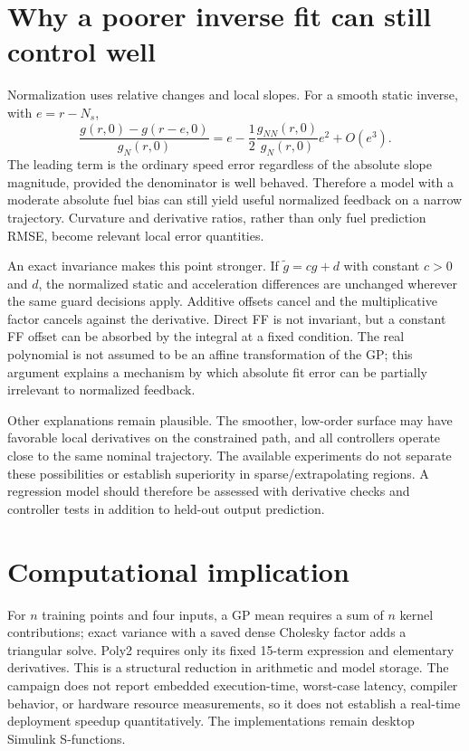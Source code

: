\section{Why a poorer inverse fit can still control well}
Normalization uses relative changes and local slopes. For a smooth static inverse, with $e=r-N_s$,
\begin{equation}
\frac{g(r,0)-g(r-e,0)}{g_N(r,0)}
=e-\frac12\frac{g_{NN}(r,0)}{g_N(r,0)}e^2+O(e^3).
\end{equation}
The leading term is the ordinary speed error regardless of the absolute slope magnitude, provided the denominator is well behaved. Therefore a model with a moderate absolute fuel bias can still yield useful normalized feedback on a narrow trajectory. Curvature and derivative ratios, rather than only fuel prediction RMSE, become relevant local error quantities.

An exact invariance makes this point stronger. If $\tilde g=cg+d$ with constant $c>0$ and $d$, the normalized static and acceleration differences are unchanged wherever the same guard decisions apply. Additive offsets cancel and the multiplicative factor cancels against the derivative. Direct FF is not invariant, but a constant FF offset can be absorbed by the integral at a fixed condition. The real polynomial is not assumed to be an affine transformation of the GP; this argument explains a mechanism by which absolute fit error can be partially irrelevant to normalized feedback.

Other explanations remain plausible. The smoother, low-order surface may have favorable local derivatives on the constrained path, and all controllers operate close to the same nominal trajectory. The available experiments do not separate these possibilities or establish superiority in sparse/extrapolating regions. A regression model should therefore be assessed with derivative checks and controller tests in addition to held-out output prediction.

\section{Computational implication}
For $n$ training points and four inputs, a GP mean requires a sum of $n$ kernel contributions; exact variance with a saved dense Cholesky factor adds a triangular solve. Poly2 requires only its fixed 15-term expression and elementary derivatives. This is a structural reduction in arithmetic and model storage. The campaign does not report embedded execution-time, worst-case latency, compiler behavior, or hardware resource measurements, so it does not establish a real-time deployment speedup quantitatively. The implementations remain desktop Simulink S-functions.


